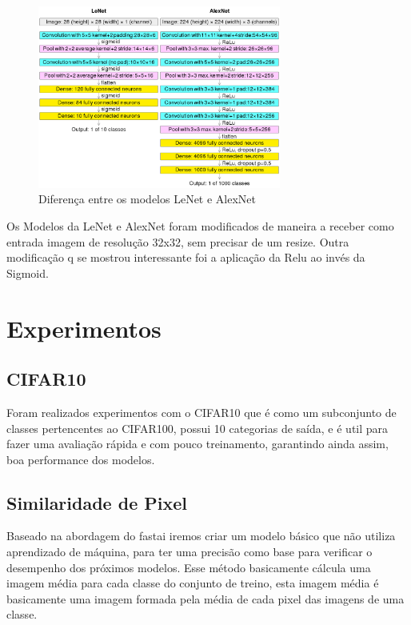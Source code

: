 \documentclass[conference]{IEEEtran}
\begin{document}
\begin{figure}[h]
	\centerline{\includegraphics[width=8cm]{Images/Comparison_image_neural_networks.svg.png}}
	
	\caption{\label{fig:fig2}Diferença entre os modelos LeNet e AlexNet}
\end{figure}

Os Modelos da LeNet e AlexNet foram modificados de maneira a receber como entrada imagem de resolução 32x32, sem precisar de um resize. Outra modificação q se mostrou interessante foi a aplicação da Relu ao invés da Sigmoid.


\section{Experimentos}


\subsection{CIFAR10}
Foram realizados experimentos com o CIFAR10 que é como um subconjunto de classes pertencentes ao CIFAR100, possui 10 categorias de saída, e é util para fazer uma avaliação rápida e com pouco treinamento, garantindo ainda assim, boa performance dos modelos.

\subsection{Similaridade de Pixel}

Baseado na abordagem do fastai \cite{howard2020deep}
iremos criar um modelo básico que não utiliza aprendizado de máquina, 
para ter uma precisão como base para verificar o desempenho dos próximos modelos.
Esse método basicamente cálcula uma imagem média para cada classe do conjunto de treino, 
esta imagem média é basicamente uma imagem formada pela média de cada pixel das imagens de uma classe.
\end{document}
